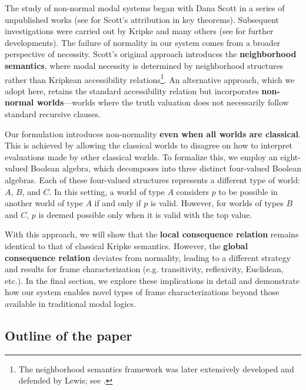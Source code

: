 \documentclass{amsart}
\begin{document}
The study of non-normal modal systems began with Dana Scott in a series of unpublished works (see \cite{lemmon_algebraic_1966, lewis_counterfactuals_1973} for Scott's attribution in key theorems). Subsequent investigations were carried out by Kripke \cite{kripke_semantical_1963} and many others (see \cite{berto_impossible_2019, priest_introduction_2008} for further developments). 
The failure of normality in our system comes from a broader perspective of necessity. Scott’s original approach introduces the \textbf{neighborhood semantics}, where modal necessity is determined by neighborhood structures rather than Kripkean accessibility relations\footnote{The neighborhood semantics framework was later extensively developed and defended by Lewis; see \cite{lewis_general_1970, lewis_counterfactuals_1973}.}. An alternative approach, which we adopt here, retains the standard accessibility relation but incorporates \textbf{non-normal worlds}—worlds where the truth valuation does not necessarily follow standard recursive clauses.

Our formulation introduces non-normality \textbf{even when all worlds are classical}. This is achieved by allowing the classical worlds to disagree on how to interpret evaluations made by other classical worlds. To formalize this, we employ an eight-valued Boolean algebra, which decomposes into three distinct four-valued Boolean algebras. Each of these four-valued structures represents a different type of world: $A$, $B$, and $C$. In this setting, a world of type $A$ considers $p$ to be possible in another world of type $A$ if and only if $p$ is valid. However, for worlds of types $B$ and $C$, $p$ is deemed possible only when it is valid with the top value.

With this approach, we will show that the \textbf{local consequence relation} remains identical to that of classical Kripke semantics. However, the \textbf{global consequence relation} deviates from normality, leading to a different strategy and results for frame characterization (e.g. transitivity, reflexivity, Euclidean, etc.). In the final section, we explore these implications in detail and demonstrate how our system enables novel types of frame characterizations beyond those available in traditional modal logics.

\subsection{Outline of the paper}
\end{document}
